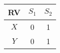 
\begin{center}
\begin{tabular}{|c|c|c|}
\hline
\textbf{RV}& \textbf{$S_1$} & \textbf{$S_2$} \\ \hline
$X$		   	&   0      & 1\\ \hline
$Y$ 		&	0      & 1\\ \hline
\end{tabular}
\end{center}
